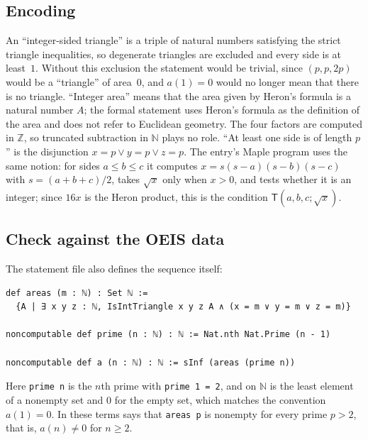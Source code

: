 \documentclass[11pt]{amsart}
\theoremstyle{plain}
\theoremstyle{definition}
\newcommand{\N}{\mathbb{N}}
\newcommand{\Z}{\mathbb{Z}}
\newcommand{\T}{\mathsf{T}}
\begin{document}
\subsection*{Encoding}
An ``integer-sided triangle'' is a triple of natural numbers satisfying the strict triangle inequalities, so degenerate triangles are excluded and every side is at least~$1$.
Without this exclusion the statement would be trivial, since $(p,p,2p)$ would be a ``triangle'' of area~$0$, and $a(1)=0$ would no longer mean that there is no triangle.
``Integer area'' means that the area given by Heron's formula is a natural number $A$; the formal statement uses Heron's formula as the definition of the area and does not refer to Euclidean geometry.
The four factors are computed in $\Z$, so truncated subtraction in $\N$ plays no role.
``At least one side is of length $p$'' is the disjunction $x=p\lor y=p\lor z=p$.
The entry's Maple program uses the same notion: for sides $a\le b\le c$ it computes $x=s(s-a)(s-b)(s-c)$ with $s=(a+b+c)/2$, takes $\sqrt{x}$ only when $x>0$, and tests whether it is an integer; since $16x$ is the Heron product, this is the condition $\T(a,b,c;\sqrt{x})$.

\subsection*{Check against the OEIS data}
The statement file also defines the sequence itself:
\begin{lstlisting}
def areas (m : ℕ) : Set ℕ :=
  {A | ∃ x y z : ℕ, IsIntTriangle x y z A ∧ (x = m ∨ y = m ∨ z = m)}

noncomputable def prime (n : ℕ) : ℕ := Nat.nth Nat.Prime (n - 1)

noncomputable def a (n : ℕ) : ℕ := sInf (areas (prime n))
\end{lstlisting}
Here \texttt{prime n} is the $n$th prime with \texttt{prime 1 = 2}, and  on $\N$ is the least element of a nonempty set and $0$ for the empty set, which matches the convention $a(1)=0$.
In these terms  says that \texttt{areas p} is nonempty for every prime $p>2$, that is, $a(n)\ne0$ for $n\ge2$.
\end{document}
